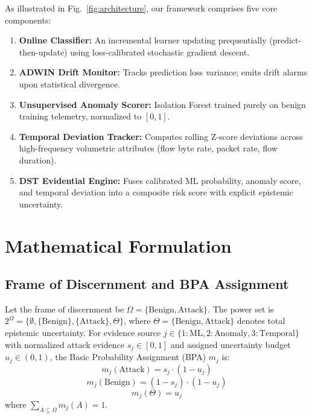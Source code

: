 \documentclass[conference]{IEEEtran}
\begin{document}
As illustrated in Fig.~\ref{fig:architecture}, our framework comprises five core components:
\begin{enumerate}
    \item \textbf{Online Classifier:} An incremental learner updating prequentially (predict-then-update) using loss-calibrated stochastic gradient descent.
    \item \textbf{ADWIN Drift Monitor:} Tracks prediction loss variance; emits drift alarms upon statistical divergence.
    \item \textbf{Unsupervised Anomaly Scorer:} Isolation Forest trained purely on benign training telemetry, normalized to $[0, 1]$.
    \item \textbf{Temporal Deviation Tracker:} Computes rolling Z-score deviations across high-frequency volumetric attributes (flow byte rate, packet rate, flow duration).
    \item \textbf{DST Evidential Engine:} Fuses calibrated ML probability, anomaly score, and temporal deviation into a composite risk score with explicit epistemic uncertainty.
\end{enumerate}

\section{Mathematical Formulation}
\subsection{Frame of Discernment and BPA Assignment}
Let the frame of discernment be $\Omega = \{\text{Benign}, \text{Attack}\}$. The power set is $2^\Omega = \{\emptyset, \{\text{Benign}\}, \{\text{Attack}\}, \Theta\}$, where $\Theta = \{\text{Benign}, \text{Attack}\}$ denotes total epistemic uncertainty.
For evidence source $j \in \{1: \text{ML}, 2: \text{Anomaly}, 3: \text{Temporal}\}$ with normalized attack evidence $s_j \in [0, 1]$ and assigned uncertainty budget $u_j \in (0, 1)$, the Basic Probability Assignment (BPA) $m_j$ is:
\begin{equation}
m_j(\text{Attack}) = s_j \cdot (1 - u_j)
\end{equation}
\begin{equation}
m_j(\text{Benign}) = (1 - s_j) \cdot (1 - u_j)
\end{equation}
\begin{equation}
m_j(\Theta) = u_j
\end{equation}
where $\sum_{A \subseteq \Omega} m_j(A) = 1$.
\end{document}

